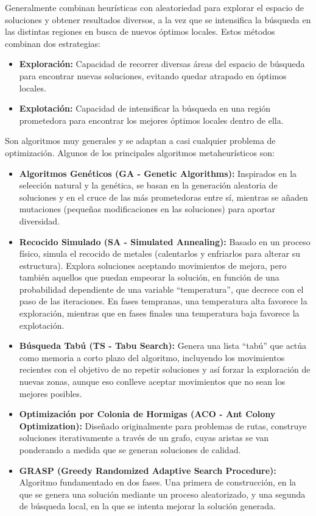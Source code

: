 \documentclass[12pt,a4paper]{book}
\begin{document}
Generalmente combinan heurísticas con aleatoriedad para explorar el espacio de soluciones y obtener resultados diversos, a la vez que se intensifica la búsqueda en las distintas regiones en busca de nuevos óptimos locales. Estos métodos combinan dos estrategias:
\begin{itemize}
    \item \textbf{Exploración:} Capacidad de recorrer diversas áreas del espacio de búsqueda para encontrar nuevas soluciones, evitando quedar atrapado en óptimos locales.
    \item \textbf{Explotación:} Capacidad de intensificar la búsqueda en una región prometedora para encontrar los mejores óptimos locales dentro de ella.
\end{itemize}

Son algoritmos muy generales y se adaptan a casi cualquier problema de optimización. Algunos de los principales algoritmos metaheurísticos son:
\begin{itemize}
    \item \textbf{Algoritmos Genéticos (GA - Genetic Algorithms):}
    Inspirados en la selección natural y la genética, se basan en la generación aleatoria de soluciones y en el cruce de las más prometedoras entre sí, 
    mientras se añaden mutaciones (pequeñas modificaciones en las soluciones) para aportar diversidad.
    
    \item \textbf{Recocido Simulado (SA - Simulated Annealing):}
    Basado en un proceso físico, simula el recocido de metales (calentarlos y enfriarlos para alterar su estructura). Explora soluciones aceptando movimientos de mejora, pero también aquellos que puedan empeorar la solución, 
    en función de una probabilidad dependiente de una variable ``temperatura'', que decrece con el paso de las iteraciones. En fases tempranas, una temperatura alta favorece la exploración, mientras que en fases finales una temperatura baja favorece la explotación.
    
    \item \textbf{Búsqueda Tabú (TS - Tabu Search):}
    Genera una lista ``tabú'' que actúa como memoria a corto plazo del algoritmo, incluyendo los movimientos recientes con el objetivo de no repetir soluciones y así forzar la exploración de nuevas zonas, aunque eso conlleve aceptar movimientos que no sean los mejores posibles.
    
    \item \textbf{Optimización por Colonia de Hormigas (ACO - Ant Colony Optimization):}
    Diseñado originalmente para problemas de rutas, construye soluciones iterativamente a través de un grafo, cuyas aristas se van ponderando a medida que se generan soluciones de calidad.
    
    \item \textbf{GRASP (Greedy Randomized Adaptive Search Procedure):}
    Algoritmo fundamentado en dos fases. Una primera de construcción, en la que se genera una solución mediante un proceso aleatorizado, y una segunda de búsqueda local, en la que se intenta mejorar la solución generada.
\end{itemize}
\end{document}
